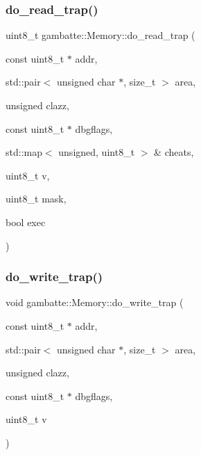 \subsubsection{\texorpdfstring{do\+\_\+read\+\_\+trap()}{do\_read\_trap()}}
{\footnotesize\ttfamily uint8\+\_\+t gambatte\+::\+Memory\+::do\+\_\+read\+\_\+trap (\begin{DoxyParamCaption}\item[{const uint8\+\_\+t $\ast$}]{addr,  }\item[{std\+::pair$<$ unsigned char $\ast$, size\+\_\+t $>$}]{area,  }\item[{unsigned}]{clazz,  }\item[{const uint8\+\_\+t $\ast$}]{dbgflags,  }\item[{std\+::map$<$ unsigned, uint8\+\_\+t $>$ \&}]{cheats,  }\item[{uint8\+\_\+t}]{v,  }\item[{uint8\+\_\+t}]{mask,  }\item[{bool}]{exec }\end{DoxyParamCaption})\hspace{0.3cm}{\ttfamily [inline]}}

\mbox{\label{classgambatte_1_1Memory_a8fe0102b1325cd50a8cb133a02ceb77e}} 
\subsubsection{\texorpdfstring{do\+\_\+write\+\_\+trap()}{do\_write\_trap()}}
{\footnotesize\ttfamily void gambatte\+::\+Memory\+::do\+\_\+write\+\_\+trap (\begin{DoxyParamCaption}\item[{const uint8\+\_\+t $\ast$}]{addr,  }\item[{std\+::pair$<$ unsigned char $\ast$, size\+\_\+t $>$}]{area,  }\item[{unsigned}]{clazz,  }\item[{const uint8\+\_\+t $\ast$}]{dbgflags,  }\item[{uint8\+\_\+t}]{v }\end{DoxyParamCaption})\hspace{0.3cm}{\ttfamily [inline]}}

\mbox{\label{classgambatte_1_1Memory_a71209c5ac16a9616891af00f252ed8ff}} 

